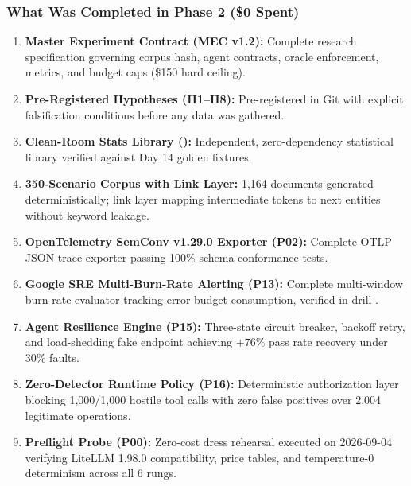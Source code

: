 \subsubsection{What Was Completed in Phase 2 (\$0 Spent)}
\begin{enumerate}\setlength{\itemsep}{1.2pt}\setlength{\parsep}{0pt}
    \item \textbf{Master Experiment Contract (MEC v1.2):} Complete research specification governing corpus hash, agent contracts, oracle enforcement, metrics, and budget caps (\$150 hard ceiling).
    \item \textbf{Pre-Registered Hypotheses (H1--H8):} Pre-registered in Git with explicit falsification conditions before any data was gathered.
    \item \textbf{Clean-Room Stats Library ():} Independent, zero-dependency statistical library verified against Day 14 golden fixtures.
    \item \textbf{350-Scenario Corpus with Link Layer:} 1,164 documents generated deterministically; link layer mapping intermediate tokens to next entities without keyword leakage.
    \item \textbf{OpenTelemetry SemConv v1.29.0 Exporter (P02):} Complete OTLP JSON trace exporter passing 100\% schema conformance tests.
    \item \textbf{Google SRE Multi-Burn-Rate Alerting (P13):} Complete multi-window burn-rate evaluator tracking error budget consumption, verified in drill .
    \item \textbf{Agent Resilience Engine (P15):} Three-state circuit breaker, backoff retry, and load-shedding fake endpoint achieving $+76\%$ pass rate recovery under 30\% faults.
    \item \textbf{Zero-Detector Runtime Policy (P16):} Deterministic authorization layer blocking 1,000/1,000 hostile tool calls with zero false positives over 2,004 legitimate operations.
    \item \textbf{Preflight Probe (P00):} Zero-cost dress rehearsal executed on 2026-09-04 verifying LiteLLM 1.98.0 compatibility, price tables, and temperature-0 determinism across all 6 rungs.
\end{enumerate}

